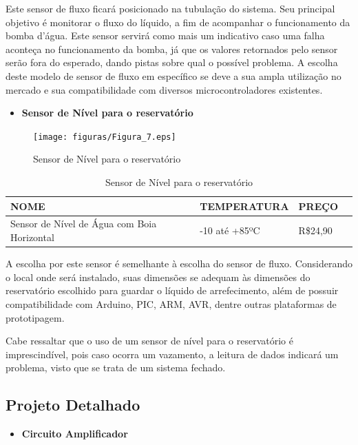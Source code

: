 Este sensor de fluxo ficará posicionado na tubulação do sistema. Seu principal objetivo é monitorar o fluxo do líquido, a fim de acompanhar o funcionamento da bomba d’água. Este sensor servirá como mais um indicativo caso uma falha aconteça no funcionamento da bomba, já que os valores retornados pelo sensor serão fora do esperado, dando pistas sobre qual o possível problema. A escolha deste modelo de sensor de fluxo em específico se deve a sua ampla utilização no mercado e sua compatibilidade com diversos microcontroladores existentes.
\newpage
\begin{itemize}
    \item \textbf{Sensor de Nível para o reservatório}
\end{itemize}
\begin{figure}[!h]                  
	\centering                          
	\texttt{[image: figuras/Figura\_7.eps]}
	\caption{ Sensor de Nível para o reservatório}   \label{figsensor5}       
\end{figure}

\begin{table}[!h]
    \centering
    \begin{tabular}{|p{3cm}|p{5cm}|p{3cm}|p{3cm}|}
    \hline
    \textbf{NOME} & \textbf{TEMPERATURA}    & \textbf{PREÇO} \\ \hline
    Sensor de Nível de Água com Boia Horizontal      & -10 até +85ºC &  R\$24,90  \\ \hline
    \end{tabular}
    \caption{Sensor de Nível para o reservatório}
    \end{table}

A escolha por este sensor é semelhante à escolha do sensor de fluxo. Considerando o local onde será instalado, suas dimensões se adequam às dimensões do reservatório escolhido para guardar o líquido de arrefecimento, além de possuir compatibilidade com Arduino, PIC, ARM, AVR, dentre outras plataformas de prototipagem.

Cabe ressaltar que o uso de um sensor de nível para o reservatório é imprescindível, pois caso ocorra um vazamento, a leitura de dados indicará um problema, visto que se trata de um sistema fechado.

\subsection{Projeto Detalhado}

\begin{itemize}
    \item \textbf{Circuito Amplificador}
\end{itemize}

